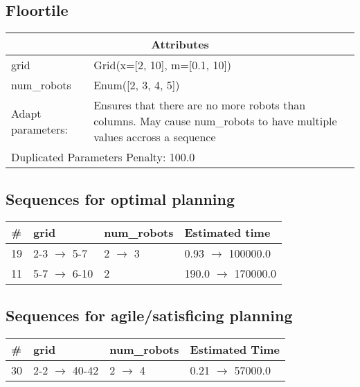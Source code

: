 \documentclass{article}
\begin{document}
                            \newpage \subsection{Floortile}
                    \begin{center}
                    \begin{tabular}{@{}p{}p{}@{}}
                    \multicolumn{2}{c}{\bf \large Attributes}\\\midrule
                    grid & Grid(x=[2, 10], m=[0.1, 10])\\
num\_robots & Enum([2, 3, 4, 5])
                    \\\midrule
                    Adapt parameters: & Ensures that there are no more robots than columns. May cause num\_robots to have multiple values accross a sequence \\\midrule
                    \multicolumn{2}{l}{Duplicated Parameters Penalty: 100.0}
                    \end{tabular}
                    \end{center}
                
                            \subsection*{Sequences for optimal planning}

                            \begin{center}
                            \begin{tabular}{@{}l|l|l|l@{}}
                            \# & grid & num\_robots & Estimated time\\\midrule
                            19&2-3 $\rightarrow$ 5-7&2 $\rightarrow$ 3&0.93 $\rightarrow$ 100000.0\\
11&5-7 $\rightarrow$ 6-10&2&190.0 $\rightarrow$ 170000.0
                            \end{tabular}
                            \end{center}
                    
                         \subsection*{Sequences for agile/satisficing planning}

                        \begin{center}
                        \begin{tabular}{@{}l|l|l|l@{}}
                        \# & grid & num\_robots & Estimated Time\\\midrule
                        30&2-2 $\rightarrow$ 40-42&2 $\rightarrow$ 4&0.21 $\rightarrow$ 57000.0
                        \end{tabular}
                        \end{center}
                    
\end{document}
